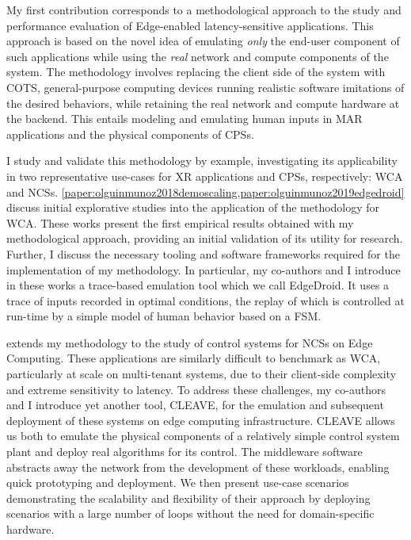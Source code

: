 \medskip

My first contribution corresponds to a methodological approach to the study and performance evaluation of Edge-enabled latency-sensitive applications. 
This approach is based on the novel idea of emulating \emph{only} the end-user component of such applications while using the \emph{real} network and compute components of the system.
The methodology involves replacing the client side of the system with \gls{COTS}, general-purpose computing devices running realistic software imitations of the desired behaviors, while retaining the real network and compute hardware at the backend.
This entails modeling and emulating human inputs in \gls{MAR} applications and the physical components of \glspl{CPS}.

I study and validate this methodology by example, investigating its applicability in two representative use-cases for \gls{XR} applications and \glspl{CPS}, respectively: \acf{WCA} and \acfp{NCS}.
\cref{paper:olguinmunoz2018demoscaling,paper:olguinmunoz2019edgedroid} discuss initial explorative studies into the application of the methodology for \gls{WCA}.
These works present the first empirical results obtained with my methodological approach, providing an initial validation of its utility for research.
Further, I discuss the necessary tooling and software frameworks required for the implementation of my methodology.
In particular, my co-authors and I introduce in these works a trace-based emulation tool which we call EdgeDroid.
It uses a trace of inputs recorded in optimal conditions, the replay of which is controlled at run-time by a simple model of human behavior based on a \gls{FSM}.

 extends my methodology to the study of control systems for \glspl{NCS} on Edge Computing.
These applications are similarly difficult to benchmark as \gls{WCA}, particularly at scale on multi-tenant systems, due to their client-side complexity and extreme sensitivity to latency.
To address these challenges, my co-authors and I introduce yet another tool, \gls{CLEAVE}, for the emulation and subsequent deployment of these systems on edge computing infrastructure.
\gls{CLEAVE} allows us both to emulate the physical components of a relatively simple control system plant and deploy real algorithms for its control.
The middleware software abstracts away the network from the development of these workloads, enabling quick prototyping and deployment.
We then present use-case scenarios demonstrating the scalability and flexibility of their approach by deploying scenarios with a large number of loops without the need for domain-specific hardware.


